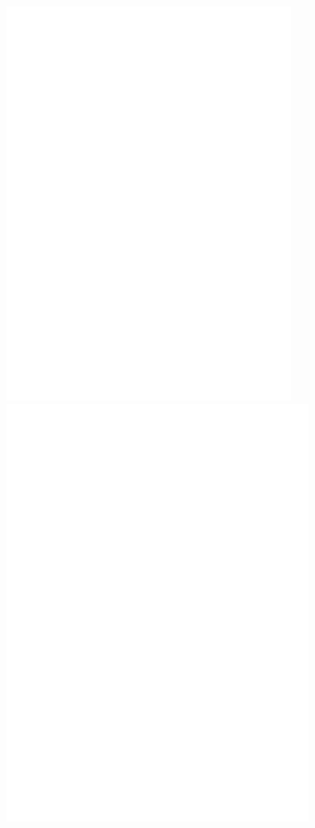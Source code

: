 \newpage

\begin{figure}
\centering
\includegraphics[width=0.85\textwidth]{Figs/autoriza}
\includegraphics[width=0.9\textwidth, draft]{Figs/autoriza}
\end{figure}
